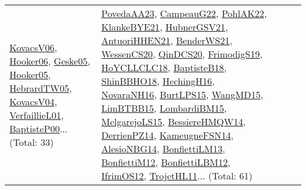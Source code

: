 {\begin{longtable}{lp{3cm}>{\raggedright}p{6cm}>{\raggedright}p{6cm}p{8cm}}
\href{papers/KovacsV06.pdf}{KovacsV06}\cite{KovacsV06}, \href{articles/Hooker06.pdf}{Hooker06}\cite{Hooker06}, \href{papers/Geske05.pdf}{Geske05}\cite{Geske05}, \href{articles/Hooker05.pdf}{Hooker05}\cite{Hooker05}, \href{papers/HebrardTW05.pdf}{HebrardTW05}\cite{HebrardTW05}, \href{papers/KovacsV04.pdf}{KovacsV04}\cite{KovacsV04}, \href{papers/VerfaillieL01.pdf}{VerfaillieL01}\cite{VerfaillieL01}, \href{articles/BaptisteP00.pdf}{BaptisteP00}\cite{BaptisteP00}... (Total: 33) & \href{papers/PovedaAA23.pdf}{PovedaAA23}\cite{PovedaAA23}, \href{articles/CampeauG22.pdf}{CampeauG22}\cite{CampeauG22}, \href{articles/PohlAK22.pdf}{PohlAK22}\cite{PohlAK22}, \href{papers/KlankeBYE21.pdf}{KlankeBYE21}\cite{KlankeBYE21}, \href{articles/HubnerGSV21.pdf}{HubnerGSV21}\cite{HubnerGSV21}, \href{papers/AntuoriHHEN21.pdf}{AntuoriHHEN21}\cite{AntuoriHHEN21}, \href{papers/BenderWS21.pdf}{BenderWS21}\cite{BenderWS21}, \href{papers/WessenCS20.pdf}{WessenCS20}\cite{WessenCS20}, \href{articles/QinDCS20.pdf}{QinDCS20}\cite{QinDCS20}, \href{papers/FrimodigS19.pdf}{FrimodigS19}\cite{FrimodigS19}, \href{papers/HoYCLLCLC18.pdf}{HoYCLLCLC18}\cite{HoYCLLCLC18}, \href{articles/BaptisteB18.pdf}{BaptisteB18}\cite{BaptisteB18}, \href{articles/ShinBBHO18.pdf}{ShinBBHO18}\cite{ShinBBHO18}, \href{papers/HechingH16.pdf}{HechingH16}\cite{HechingH16}, \href{articles/NovaraNH16.pdf}{NovaraNH16}\cite{NovaraNH16}, \href{papers/BurtLPS15.pdf}{BurtLPS15}\cite{BurtLPS15}, \href{articles/WangMD15.pdf}{WangMD15}\cite{WangMD15}, \href{papers/LimBTBB15.pdf}{LimBTBB15}\cite{LimBTBB15}, \href{papers/LombardiBM15.pdf}{LombardiBM15}\cite{LombardiBM15}, \href{papers/MelgarejoLS15.pdf}{MelgarejoLS15}\cite{MelgarejoLS15}, \href{papers/BessiereHMQW14.pdf}{BessiereHMQW14}\cite{BessiereHMQW14}, \href{papers/DerrienPZ14.pdf}{DerrienPZ14}\cite{DerrienPZ14}, \href{articles/KameugneFSN14.pdf}{KameugneFSN14}\cite{KameugneFSN14}, \href{papers/AlesioNBG14.pdf}{AlesioNBG14}\cite{AlesioNBG14}, \href{papers/BonfiettiLM13.pdf}{BonfiettiLM13}\cite{BonfiettiLM13}, \href{papers/BonfiettiM12.pdf}{BonfiettiM12}\cite{BonfiettiM12}, \href{papers/BonfiettiLBM12.pdf}{BonfiettiLBM12}\cite{BonfiettiLBM12}, \href{papers/IfrimOS12.pdf}{IfrimOS12}\cite{IfrimOS12}, \href{articles/TrojetHL11.pdf}{TrojetHL11}\cite{TrojetHL11}... (Total: 61)\\

\end{longtable}}

